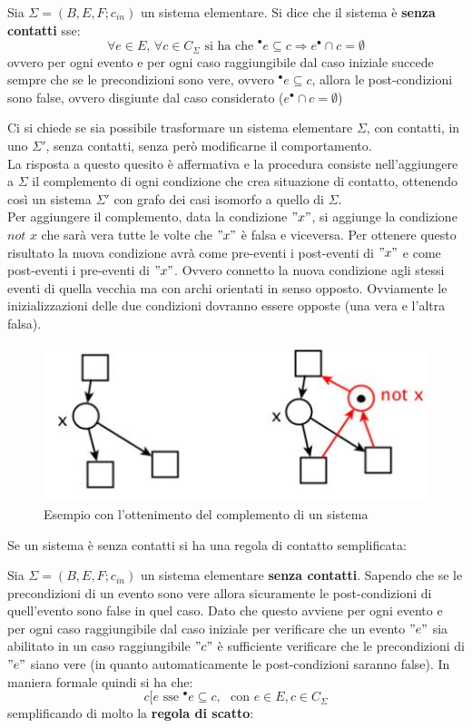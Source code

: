 \begin{definizione}
  Sia $\Sigma = (B, E, F;c_{in})$ un sistema elementare. Si dice che il sistema è
  \textbf{senza contatti} sse:
  \[\forall e\in E,\,\forall c\in C_\Sigma\mbox{ si ha che } ^\bullet
    e\subseteq c\Rightarrow e^\bullet\cap c=\emptyset\]
  ovvero per ogni evento e per ogni caso raggiungibile dal caso iniziale succede
  sempre che se le precondizioni sono vere, ovvero $^\bullet e\subseteq c$,
  allora le post-condizioni sono false, ovvero disgiunte dal caso considerato
  ($e^\bullet\cap c=\emptyset$)
\end{definizione} \vspace{5mm} %
Ci si chiede se sia possibile trasformare un sistema elementare $\Sigma$, con
contatti, in uno $\Sigma'$, senza contatti, senza però modificarne il
comportamento.\\
La risposta a questo quesito è affermativa e la procedura consiste
nell'aggiungere a $\Sigma$ il complemento di ogni condizione che crea situazione
di contatto, ottenendo così un sistema $\Sigma'$ con grafo dei casi isomorfo a
quello di $\Sigma$.\\ 
Per aggiungere il complemento, data la condizione $"x"$, si aggiunge la condizione
$not\,\, x$ che sarà vera tutte le volte che $"x"$ è falsa e viceversa. Per
ottenere questo risultato la nuova condizione avrà come pre-eventi i
post-eventi di $"x"$ e come post-eventi i pre-eventi di $"x"$. Ovvero
connetto la nuova condizione agli stessi eventi di quella vecchia ma con archi
orientati in senso opposto. Ovviamente le inizializzazioni delle due condizioni
dovranno essere opposte (una vera e l'altra falsa).
\begin{figure}[H]
  \centering
  \includegraphics[scale = 0.6]{img/con2.jpg}
  \caption{Esempio con l'ottenimento del complemento di un sistema}
\end{figure}
Se un sistema è senza contatti si ha una regola di contatto semplificata:
\begin{definizione}
  Sia $\Sigma = (B, E, F;c_{in})$ un sistema elementare \textbf{senza
    contatti}. Sapendo che se le precondizioni di un evento sono vere allora
  sicuramente le post-condizioni di quell'evento sono false in quel caso. Dato
  che questo avviene per ogni evento e per ogni caso raggiungibile dal caso
  iniziale per verificare che un evento $"e"$ sia abilitato in un caso
  raggiungibile $"c"$ è sufficiente verificare che le precondizioni di $"e"$ siano
  vere (in quanto automaticamente le post-condizioni saranno false). In
  maniera formale quindi si ha che: 
  \[c[e\mbox{ sse } ^\bullet e\subseteq c,\,\,\mbox{ con } e\in E, c\in
    C_\Sigma\]
  semplificando di molto la \textbf{regola di scatto}:
\end{definizione} \vspace{5mm} %
